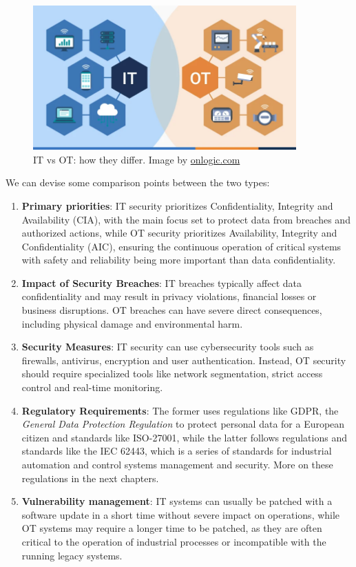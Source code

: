 \begin{figure}[ht]
  \centering
  \includegraphics[width=0.9\textwidth]{chapters/02/assets/it-ot-diff.jpg}
  \caption[IT vs OT: how they differ. Image by onlogic.com]{IT vs OT: how they differ. Image by \url{onlogic.com}}
  \label{fig:it-ot-diff}
\end{figure}

We can devise some comparison points between the two types:
\begin{enumerate}
  \item \textbf{Primary priorities}: IT security prioritizes Confidentiality, Integrity and Availability (CIA), with the main focus set to protect data from breaches and authorized actions, while OT security prioritizes Availability, Integrity and Confidentiality (AIC), ensuring the continuous operation of critical systems with safety and reliability being more important than data confidentiality.
  \item \textbf{Impact of Security Breaches}: IT breaches typically affect data confidentiality and may result in privacy violations, financial losses or business disruptions. OT breaches can have severe direct consequences, including physical damage and environmental harm.
  \item \textbf{Security Measures}: IT security can use cybersecurity tools such as firewalls, antivirus, encryption and user authentication. Instead, OT security should require specialized tools like network segmentation, strict access control and real-time monitoring.
  \item \textbf{Regulatory Requirements}: The former uses regulations like GDPR, the \textit{General Data Protection Regulation} to protect personal data for a European citizen and standards like ISO-27001, while the latter follows regulations and standards like the IEC 62443, which is a series of standards for industrial automation and control systems management and security. More on these regulations in the next chapters.
  \item \textbf{Vulnerability management}: IT systems can usually be patched with a software update in a short time without severe impact on operations, while OT systems may require a longer time to be patched, as they are often critical to the operation of industrial processes or incompatible with the running legacy systems.
\end{enumerate}

